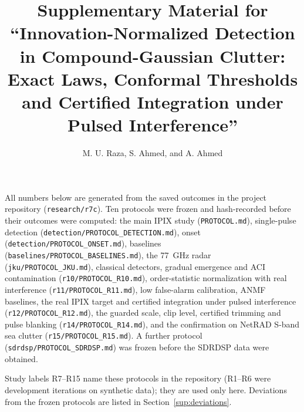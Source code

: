 \documentclass[10pt]{article}
\title{Supplementary Material for ``Innovation-Normalized Detection in Compound-Gaussian Clutter: Exact Laws, Conformal Thresholds and Certified Integration under Pulsed Interference''}
\author{M. U. Raza, S. Ahmed, and A. Ahmed}
\date{}
\begin{document}
\sloppy
\maketitle
\noindent All numbers below are generated from the saved outcomes in the project repository (\texttt{research/r7c}). Ten protocols were frozen and hash-recorded before their outcomes were computed: the main IPIX study (\texttt{PROTOCOL.md}), single-pulse detection (\texttt{detection/PROTOCOL\_DETECTION.md}), onset (\texttt{detection/PROTOCOL\_ONSET.md}), baselines (\texttt{baselines/PROTOCOL\_BASELINES.md}), the 77~GHz radar (\texttt{jku/PROTOCOL\_JKU.md}), classical detectors, gradual emergence and ACI contamination (\texttt{r10/PROTOCOL\_R10.md}), order-statistic normalization with real interference (\texttt{r11/PROTOCOL\_R11.md}), low false-alarm calibration, ANMF baselines, the real IPIX target and certified integration under pulsed interference (\texttt{r12/PROTOCOL\_R12.md}), the guarded scale, clip level, certified trimming and pulse blanking (\texttt{r14/PROTOCOL\_R14.md}), and the confirmation on NetRAD S-band sea clutter (\texttt{r15/PROTOCOL\_R15.md}). A further protocol (\texttt{sdrdsp/PROTOCOL\_SDRDSP.md}) was frozen before the SDRDSP data were obtained.

Study labels R7--R15 name these protocols in the repository (R1--R6 were development iterations on synthetic data); they are used only here. Deviations from the frozen protocols are listed in Section~\ref{sup:deviations}.
\end{document}
